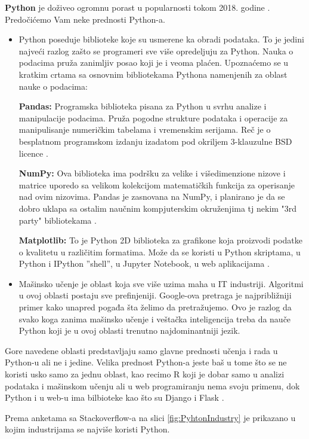 \documentclass[a4paper]{article}
\begin{document}
\textbf{Python} je doživeo ogromnu porast u popularnosti tokom 2018. godine \cite{python}. Predočićemo Vam neke prednosti Python-a.
\begin{itemize}
    \item Python poseduje biblioteke koje su usmerene ka obradi podataka. To je jedini najveći razlog zašto se programeri sve više opredeljuju za Python. Nauka o podacima pruža zanimljiv posao koji je i veoma plaćen. Upoznaćemo se u kratkim crtama sa osnovnim bibliotekama Pythona namenjenih za oblast nauke o podacima:
    
    \textbf{Pandas:} Programska biblioteka pisana za Python u svrhu analize i manipulacije podacima. Pruža pogodne strukture podataka i operacije za manipulisanje numeričkim tabelama i vremenskim serijama. Reč je o besplatnom programskom izdanju izadatom pod okriljem 3-klauzulne BSD licence \cite{pandas}.
    
    \textbf{NumPy:} Ova biblioteka ima podršku za velike i višedimenzione nizove i matrice uporedo sa velikom kolekcijom matematičkih funkcija za operisanje nad ovim nizovima. Pandas je zasnovana na NumPy, i planirano je da se dobro uklapa sa ostalim naučnim kompjuterskim okruženjima tj nekim "3rd party" bibliotekama \cite{numPy}.
    
    \textbf{Matplotlib:} To je Python 2D biblioteka za grafikone koja proizvodi podatke o kvalitetu u različitim formatima. Može da se koristi u Python skriptama, u Python i IPython ''shell'', u Jupyter Notebook, u web aplikacijama \cite{matplotlib}.

    \item Mašinsko učenje je oblast koja sve više uzima maha u IT industriji. Algoritmi u ovoj oblasti postaju sve prefinjeniji. Google-ova pretraga je najpribližniji primer kako unapred pogađa šta želimo da pretražujemo. Ovo je razlog da svako koga zanima mašinsko učenje i veštačka inteligencija treba da nauče Python koji je u ovoj oblasti trenutno najdominantniji jezik.
\end{itemize}
    
    Gore navedene oblasti predstavljaju samo glavne prednosti učenja i rada u Python-u ali ne i jedine. Velika prednost Python-a jeste baš u tome što se ne koristi usko samo za jednu oblast, kao recimo R koji je dobar samo u analizi podataka i mašinskom učenju ali u web programiranju nema svoju primenu, dok Python i u web-u ima bilbioteke kao što su Django i Flask \cite{django, flask}.
    
    Prema anketama sa Stackoverflow-a na slici \ref{fig:PyhtonIndustry} je prikazano u kojim industrijama se najviše koristi Python.
    
\end{document}

